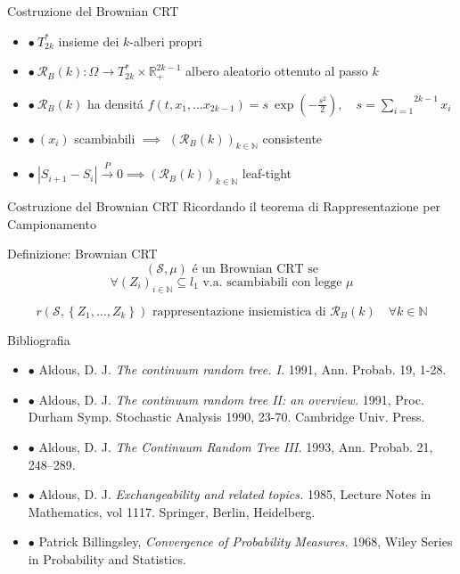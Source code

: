 \documentclass{beamer}
\theoremstyle{definition}
\theoremstyle{plain}
\theoremstyle{remark}
\begin{document}
\begin{frame}{Costruzione del Brownian CRT}
\begin{itemize}
\item $\bullet \ T^*_{2k}$ insieme dei $k$-alberi propri
\bigskip
\item $\bullet \ \mathscr{R}_B(k):\Omega\longrightarrow T^*_{2k}\times \mathbb{R}_+^{2k-1}$ albero aleatorio ottenuto al passo $k$
\bigskip
\pause
\item $\bullet \  \mathscr{R}_B(k)$ ha densit\'a $ f\left(t,x_1, \dots x_{2k-1}\right)= s \ \exp\left(-\frac{s^2}{2}\right), \quad s=\stackrel{2k-1}{\sum\limits_{i=1}} x_i$
\bigskip
\pause
\item $\bullet \ (x_i)$ scambiabili $\implies$ $\left(\mathscr{R}_B(k)\right)_{k\in\mathbb{N}}$ consistente
\bigskip
\pause
\item $\bullet \ |S_{i+1}-S_i|\xrightarrow{P} 0 \implies \left(\mathscr{R}_B(k)\right)_{k\in\mathbb{N}}$ leaf-tight
 
\end{itemize}
\end{frame}

\begin{frame}{Costruzione del Brownian CRT}
\center Ricordando il teorema di Rappresentazione per Campionamento
\vspace{.5cm}
\begin{block}{Definizione: Brownian CRT}
\vspace{.15cm}
 $$\left(\mathscr{S}, \mu\right)\text{ \'e un Brownian CRT se}$$
 $$\forall \left(Z_i\right)_{i\in\mathbb{N}}\subseteq l_1 \text{ v.a. scambiabili con legge } \mu$$
 
 $$ r\left(\mathscr{S}, \left\{Z_1, \dots ,Z_k\right\}\right)\text{ rappresentazione insiemistica di } \mathscr{R}_B(k) \quad \forall k\in\mathbb{N}$$
 \vspace{.3cm}
\end{block}
\end{frame}


\begin{frame}{Bibliografia}
\begin{itemize}
\item $\bullet$ Aldous, D. J. \textit{The continuum random tree. I.} 1991, Ann. Probab. 19, 1-28.

\item $\bullet$ Aldous, D. J. \textit{The continuum random tree II: an overview.} 1991, Proc. Durham Symp. Stochastic Analysis 1990, 23-70. Cambridge Univ. Press.

\item $\bullet$ Aldous, D. J.  \textit{The Continuum Random Tree III.} 1993, Ann. Probab. 21, 248--289.

\item $\bullet$ Aldous, D. J. \textit{Exchangeability and related topics.} 1985, Lecture Notes in Mathematics, vol 1117. Springer, Berlin, Heidelberg.

\item $\bullet$ Patrick Billingsley, \textit{Convergence of Probability Measures.} 1968, Wiley Series in Probability and Statistics.

\end{itemize}
\end{frame}
\end{document}
